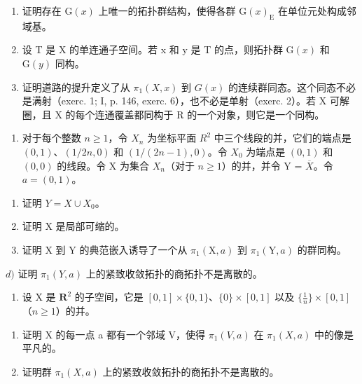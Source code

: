 \begin{enumerate}
\def\labelenumi{\alph{enumi})}
\setcounter{enumi}{2}
\item
证明存在 \(\mathrm{G}(x)\) 上唯一的拓扑群结构，使得各群 \(\mathrm{G}(x)_{\mathrm{E}}\) 在单位元处构成邻域基。
\item
设 T 是 X 的单连通子空间。若 x 和 y 是 T 的点，则拓扑群 \(\mathrm{G}(x)\) 和 \(\mathrm{G}(y)\) 同构。
\item
证明道路的提升定义了从 \(\pi_{1}(X,x)\) 到 \(G(x)\) 的连续群同态。这个同态不必是满射（exerc. 1; I, p. 146, exerc. 6），也不必是单射（exerc. 2）。若 X 可解圈，且 X 的每个连通覆盖都同构于 R 的一个对象，则它是一个同构。
\end{enumerate}

\begin{enumerate}
\def\labelenumi{\arabic{enumi})}
\setcounter{enumi}{3}
\tightlist
\item
对于每个整数 \(n \geqslant 1\)，令 \(X_{n}\) 为坐标平面 \(R^{2}\) 中三个线段的并，它们的端点是 \((0,1)\)、\((1/2n,0)\) 和 \((1/(2n-1),0)\)。令 \(X_{0}\) 为端点是 \((0,1)\) 和 \((0,0)\) 的线段。令 X 为集合 \(X_{n}\)（对于 \(n \geqslant 1\)）的并，并令 Y = \(\overline{X}\)。令 \(a = (0,1)\)。
\end{enumerate}

\begin{enumerate}
\def\labelenumi{\alph{enumi})}
\item
证明 \(Y = X \cup X_{0}\)。
\item
证明 X 是局部可缩的。
\item
证明 X 到 Y 的典范嵌入诱导了一个从 \(\pi_1(\mathrm{X},a)\) 到 \(\pi_1(\mathrm{Y},a)\) 的群同构。
\end{enumerate}

\(d)\) 证明 \(\pi_1(Y,a)\) 上的紧致收敛拓扑的商拓扑不是离散的。

\begin{enumerate}
\def\labelenumi{\arabic{enumi})}
\setcounter{enumi}{4}
\tightlist
\item
设 X 是 \(\mathbf{R}^2\) 的子空间，它是 \([0,1] \times \{0,1\}\)、\(\{0\} \times [0,1]\) 以及 \(\{\frac{1}{n}\} \times [0,1]\)（\(n \geqslant 1\)）的并。
\end{enumerate}

\begin{enumerate}
\def\labelenumi{\alph{enumi})}
\item
证明 X 的每一点 a 都有一个邻域 V，使得 \(\pi_{1}(V,a)\) 在 \(\pi_{1}(X,a)\) 中的像是平凡的。
\item
证明群 \(\pi_{1}(X,a)\) 上的紧致收敛拓扑的商拓扑不是离散的。
\end{enumerate}

